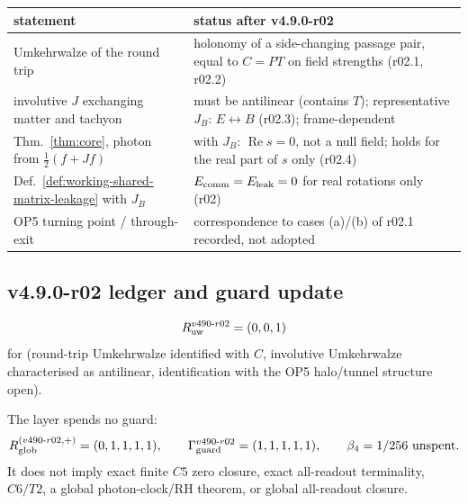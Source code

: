 \begin{center}
\small
\begin{tabular}{@{}>{\raggedright\arraybackslash}p{}>{\raggedright\arraybackslash}p{}@{}}
\toprule
statement & status after v4.9.0-r02\\
\midrule
Umkehrwalze of the round trip & holonomy of a side-changing passage pair, equal to \(C=PT\) on field strengths (r02.1, r02.2)\\
involutive \(J\) exchanging matter and tachyon & must be antilinear (contains \(T\)); representative \(J_B\): \(E\leftrightarrow B\) (r02.3); frame-dependent\\
Thm.~\ref{thm:core}, photon from \(\tfrac12(f+Jf)\) & with \(J_B\): \(\operatorname{Re}s=0\), not a null field; holds for the real part of \(s\) only (r02.4)\\
Def.~\ref{def:working-shared-matrix-leakage} with \(J_B\) & \(E_{\rm comm}=E_{\rm leak}=0\) for real rotations only (r02)\\
OP5 turning point / through-exit & correspondence to cases (a)/(b) of r02.1 recorded, not adopted\\
\bottomrule
\end{tabular}
\end{center}

\subsection*{v4.9.0-r02 ledger and guard update}
\label{subsec:v490-r02-ledger-guard}

\[
R_{\rm uw}^{v490\text{-}r02}=(0,0,1)
\]
for (round-trip Umkehrwalze identified with \(C\), involutive Umkehrwalze characterised as antilinear,
identification with the OP5 halo/tunnel structure open).

The layer spends no guard:
\[
R_{\rm glob}^{(v490\text{-}r02,+)}=(0,1,1,1,1),
\qquad
\Gamma_{\rm guard}^{v490\text{-}r02}=(1,1,1,1,1),
\qquad
\beta_4=1/256\ \text{unspent}.
\]
It does not imply exact finite \(C5\) zero closure, exact all-readout terminality,
\(C6/T2\), a global photon-clock/RH theorem, or global all-readout closure.

